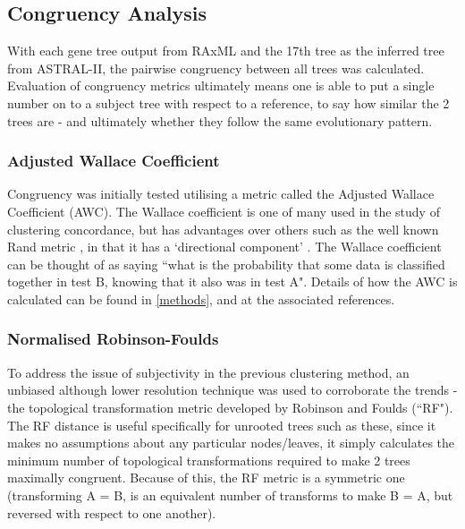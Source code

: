 \subsection{Congruency Analysis}
	With each gene tree output from RAxML and the 17th tree as the inferred tree from ASTRAL-II, the pairwise congruency between all trees was calculated. Evaluation of congruency metrics ultimately means one is able to put a single number on to a subject tree with respect to a reference, to say how similar the 2 trees are - and ultimately whether they follow the same evolutionary pattern.
	
\subsubsection{Adjusted Wallace Coefficient}
	Congruency was initially tested utilising a metric called the Adjusted Wallace Coefficient (AWC). The Wallace coefficient is one of many used in the study of clustering concordance, but has advantages over others such as the well known Rand metric \citep{Rand1971}, in that it has a `directional component' \citep{Wallace1983}. The Wallace coefficient can be thought of as saying ``what is the probability that some data is classified together in test B, knowing that it also was in test A". Details of how the AWC is calculated can be found in \vref{methods}, and at the associated references.

\subsubsection{Normalised Robinson-Foulds}
	To address the issue of subjectivity in the previous clustering method, an unbiased although lower resolution technique was used to corroborate the trends - the topological transformation metric developed by Robinson and Foulds (``RF")\citep{Robinson1981}. The RF distance is useful specifically for unrooted trees such as these, since it makes no assumptions about any particular nodes/leaves, it simply calculates the minimum number of topological transformations required to make 2 trees maximally congruent.  Because of this, the RF metric is a symmetric one (transforming A = B, is an equivalent number of transforms to make B = A, but reversed with respect to one another). 
	
